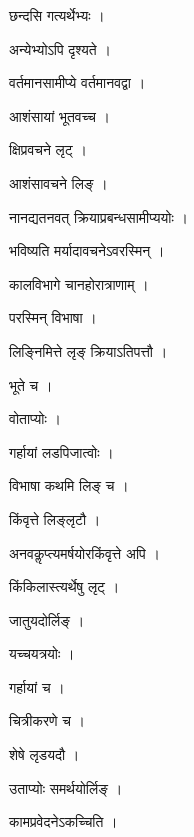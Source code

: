 \documentclass[10pt, openany]{book}
\begin{document}
\noindent छन्दसि गत्यर्थेभ्यः ।

\noindent अन्येभ्योऽपि दृश्यते ।

\noindent वर्तमानसामीप्ये वर्तमानवद्वा ।

\noindent आशंसायां भूतवच्च ।

\noindent क्षिप्रवचने लृट् ।

\noindent आशंसावचने लिङ् ।

\noindent नानद्यतनवत् क्रियाप्रबन्धसामीप्ययोः ।

\noindent भविष्यति मर्यादावचनेऽवरस्मिन् ।

\noindent कालविभागे चानहोरात्राणाम् ।

\noindent परस्मिन् विभाषा ।

\noindent लिङ्निमित्ते लृङ् क्रियाऽतिपत्तौ ।

\noindent भूते च ।

\noindent वोताप्योः ।

\noindent गर्हायां लडपिजात्वोः ।

\noindent विभाषा कथमि लिङ् च ।

\noindent किंवृत्ते लिङ्लृटौ ।

\noindent अनवकॢप्त्यमर्षयोरकिंवृत्ते अपि ।

\noindent किंकिलास्त्यर्थेषु लृट् ।

\noindent जातुयदोर्लिङ् ।

\noindent यच्चयत्रयोः ।

\noindent गर्हायां च ।

\noindent चित्रीकरणे च ।

\noindent शेषे लृडयदौ ।

\noindent उताप्योः समर्थयोर्लिङ् ।

\noindent कामप्रवेदनेऽकच्चिति ।
\end{document}
